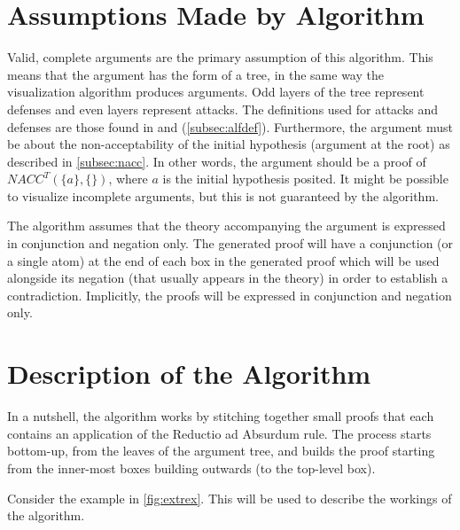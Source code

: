 \documentclass[11pt,twoside,a4paper]{report}
\begin{document}
\section{Assumptions Made by Algorithm}
Valid, complete arguments are the primary assumption of this algorithm. This means that the argument has the form of a tree, in the same way the visualization algorithm produces arguments. Odd layers of the tree represent defenses and even layers represent attacks. The definitions used for attacks and defenses are those found in  and  (\autoref{subsec:alfdef}). Furthermore, the argument must be about the non-acceptability of the initial hypothesis (argument at the root) as described in \autoref{subsec:nacc}. In other words, the argument should be a proof of $NACC^T(\{a\}, \{\})$, where $a$ is the initial hypothesis posited. It might be possible to visualize incomplete arguments, but this is not guaranteed by the algorithm.

The algorithm assumes that the theory accompanying the argument is expressed in conjunction and negation only. The generated proof will have a conjunction (or a single atom) at the end of each box in the generated proof which will be used alongside its negation (that usually appears in the theory) in order to establish a contradiction. Implicitly, the proofs will be expressed in conjunction and negation only.

\section{Description of the Algorithm}
In a nutshell, the algorithm works by stitching together small proofs that each contains an application of the Reductio ad Absurdum rule. The process starts bottom-up, from the leaves of the argument tree, and builds the proof starting from the inner-most boxes building outwards (to the top-level box).

Consider the example in \autoref{fig:extrex}. This will be used to describe the workings of the algorithm.
\end{document}
